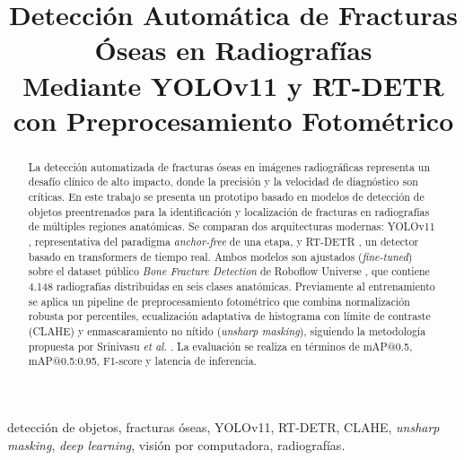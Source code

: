\documentclass[conference]{IEEEtran}
\begin{document}
\title{Detección Automática de Fracturas Óseas en Radiografías\\
Mediante YOLOv11 y RT-DETR con Preprocesamiento Fotométrico}

\author{
\and
{}
\and
{}
}

\maketitle

\begin{abstract}
La detección automatizada de fracturas óseas en imágenes radiográficas representa
un desafío clínico de alto impacto, donde la precisión y la velocidad de diagnóstico
son críticas. En este trabajo se presenta un prototipo basado en modelos de detección
de objetos preentrenados para la identificación y localización de fracturas en
radiografías de múltiples regiones anatómicas. Se comparan dos arquitecturas modernas:
YOLOv11 \cite{b3}, representativa del paradigma \textit{anchor-free} de una etapa,
y RT-DETR \cite{b4}, un detector basado en transformers de tiempo real. Ambos modelos
son ajustados (\textit{fine-tuned}) sobre el dataset público \textit{Bone Fracture
Detection} de Roboflow Universe \cite{b5}, que contiene 4.148 radiografías
distribuidas en seis clases anatómicas. Previamente al entrenamiento se aplica
un pipeline de preprocesamiento fotométrico que combina normalización robusta por
percentiles, ecualización adaptativa de histograma con límite de contraste (CLAHE)
y enmascaramiento no nítido (\textit{unsharp masking}), siguiendo la metodología
propuesta por Srinivasu \textit{et al.} \cite{b1}. La evaluación se realiza en
términos de mAP@0.5, mAP@0.5:0.95, F1-score y latencia de inferencia.
\end{abstract}

\begin{IEEEkeywords}
detección de objetos, fracturas óseas, YOLOv11, RT-DETR, CLAHE, \textit{unsharp
masking}, \textit{deep learning}, visión por computadora, radiografías.
\end{IEEEkeywords}
\end{document}
